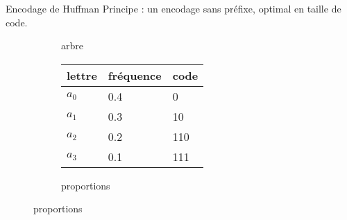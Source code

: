 \documentclass[slidetop,11pt,table]{beamer}
\begin{document}
\begin{frame}{Encodage de Huffman}
  Principe : un encodage sans préfixe, optimal en taille de code.
  \newcommand{\choice}{node[left]{\footnotesize 0} node[right]{\footnotesize 1}}
  \begin{figure}
    \begin{subfigure}{0.48\textwidth}
      \caption{arbre}
    \end{subfigure}
    \begin{subfigure}{0.48\textwidth}
      \begin{tabular}{|l|l|l|}
        \hline
        lettre & fréquence & code \\
        \hline
        $a_0$ & 0.4 & 0 \\
        $a_1$ & 0.3 & 10 \\
        $a_2$ & 0.2 & 110 \\
        $a_3$ & 0.1 & 111 \\
        \hline
      \end{tabular}
      \caption{proportions}
    \end{subfigure}

  \end{figure}
\end{frame}
\end{document}
